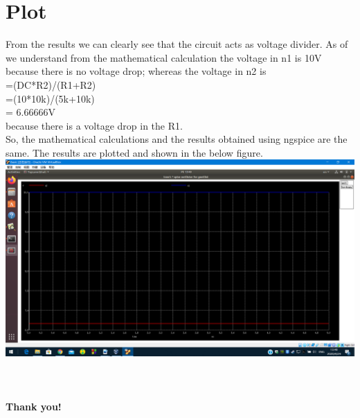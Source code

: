 \documentclass{article}
\begin{document}
\section{Plot}
From the results we can clearly see that the circuit acts as voltage divider. As of we understand from the mathematical calculation the voltage in n1 is 10V because there is no voltage drop; whereas the voltage in n2 is \\ =(DC*R2)/(R1+R2) \\ =(10*10k)/(5k+10k) \\ = 6.66666V \\ because there is a voltage drop in the R1.\\ So, the mathematical calculations and the results obtained using ngspice are the same. The results are plotted and shown in the below figure.\\
\includegraphics[width=1\textwidth]{plot.png}\\\\\\\\

\centering
\textbf{Thank you!}
\end{document}
